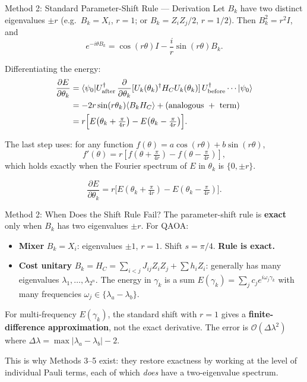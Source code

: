 \documentclass{beamer}
\begin{document}

\begin{frame}{Method 2: Standard Parameter-Shift Rule — Derivation}
Let $B_k$ have two distinct eigenvalues $\pm r$ (e.g.\ $B_k = X_i$,
$r=1$; or $B_k = Z_iZ_j/2$, $r=1/2$).  Then $B_k^2 = r^2 I$, and
\[
e^{-i\theta B_k} = \cos(r\theta)I - \frac{i}{r}\sin(r\theta)B_k.
\]

Differentiating the energy:
\begin{align*}
\frac{\partial E}{\partial\theta_k}
&= \langle\psi_0| U_{\rm after}^\dagger\,
   \frac{\partial}{\partial\theta_k}[U_k(\theta_k)^\dagger H_C U_k(\theta_k)]
   \,U_{\rm before}^\dagger \cdots |\psi_0\rangle \\
&= -2r\sin(r\theta_k)\langle B_k H_C\rangle
   + \text{(analogous } + \text{ term)} \\
&= r\Bigl[E\!\left(\theta_k+\tfrac{\pi}{4r}\right)
         - E\!\left(\theta_k-\tfrac{\pi}{4r}\right)\Bigr].
\end{align*}

The last step uses: for any function $f(\theta) = a\cos(r\theta)+b\sin(r\theta)$,
\[
f'(\theta) = r[f(\theta+\tfrac{\pi}{4r}) - f(\theta-\tfrac{\pi}{4r})],
\]
which holds exactly when the Fourier spectrum of $E$ in $\theta_k$ is
$\{0, \pm r\}$.

\[
\boxed{
\frac{\partial E}{\partial\theta_k}
= r\bigl[E(\theta_k+\tfrac{\pi}{4r})
        - E(\theta_k-\tfrac{\pi}{4r})\bigr].
}
\]
\end{frame}


\begin{frame}{Method 2: When Does the Shift Rule Fail?}
The parameter-shift rule is \textbf{exact} only when $B_k$ has two
eigenvalues $\pm r$.  For QAOA:

\begin{itemize}
\item \textbf{Mixer} $B_k = X_i$: eigenvalues $\pm 1$, $r=1$.
  Shift $s = \pi/4$.  \textbf{Rule is exact.}

\item \textbf{Cost unitary} $B_k = H_C = \sum_{i<j}J_{ij}Z_iZ_j+\sum h_iZ_i$:
  generally has many eigenvalues $\lambda_1,\dots,\lambda_{2^n}$.
  The energy in $\gamma_k$ is a sum
  $E(\gamma_k) = \sum_j c_j e^{i\omega_j\gamma_k}$ with
  many frequencies $\omega_j \in \{\lambda_a - \lambda_b\}$.
\end{itemize}

\medskip

For multi-frequency $E(\gamma_k)$, the standard shift with $r=1$
gives a \textbf{finite-difference approximation}, not the exact
derivative.  The error is $\mathcal{O}(\Delta\lambda^2)$ where
$\Delta\lambda = \max|\lambda_a - \lambda_b| - 2$.

\medskip

This is why Methods 3--5 exist: they restore exactness by working
at the level of individual Pauli terms, each of which \emph{does}
have a two-eigenvalue spectrum.
\end{frame}
\end{document}
